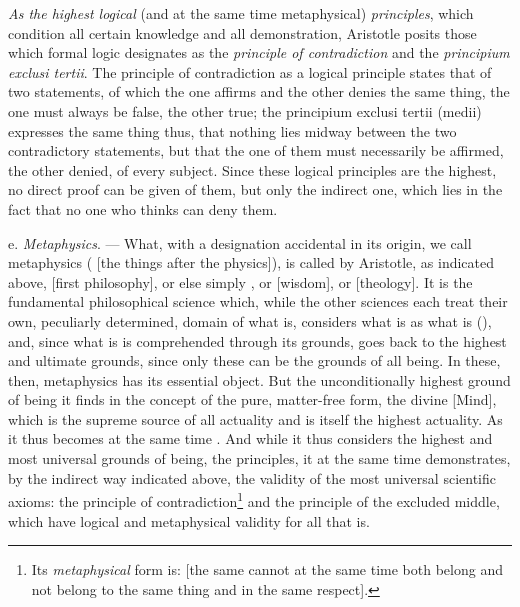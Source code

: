 \emph{As the highest logical} (and at the same time metaphysical)
\emph{principles}, which condition all certain knowledge and all
demonstration, Aristotle posits those which formal logic designates as
the \emph{principle of contradiction} and the \emph{principium exclusi
tertii}. The principle of contradiction as a logical principle states
that of two statements, of which the one affirms and the other denies
the same thing, the one must always be false, the other true; the
principium exclusi tertii (medii) expresses the same thing thus, that
nothing lies midway between the two contradictory statements, but that
the one of them must necessarily be affirmed, the other denied, of
every subject. Since these logical principles are the highest, no
direct proof can be given of them, but only
\setcounter{footnote}{0}the indirect one, which lies in the
fact that no one who thinks can deny them.

\divrule

e. \emph{Metaphysics}. --- What, with a designation accidental in its origin, we call metaphysics (
 [the things after the physics]), is called by Aristotle, as indicated above, 
 [first philosophy], or else simply , or  [wisdom], or
 [theology]. It is the fundamental philosophical science which,
while the other sciences each treat their own, peculiarly determined, domain of what is, considers what is
as what is (), and, since what is is comprehended
through its grounds, goes back to the highest and ultimate
grounds, since only these can be the grounds of all being. In these,
then, metaphysics has its essential object. But the unconditionally highest ground of being it finds in the concept of the
pure, matter-free form, the divine  [Mind], which is the supreme source of all actuality
and is itself the highest actuality. As 
it thus becomes at the same time . And while it thus
considers the highest and most universal grounds of being, the principles,
it at the same time demonstrates, by the indirect way indicated above, the validity of the most universal scientific axioms:
the principle of contradiction\footnote{Its \emph{metaphysical} form is:  [the same cannot at the same time both belong and not belong to the same thing and in the same respect].} and the principle of the excluded middle, which have logical and metaphysical validity for all
that is.

